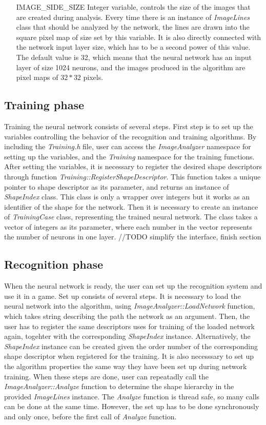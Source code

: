 \begin{enumerate}
\item [IMAGE\_SIDE\_SIZE] Integer variable, controls the size of the images that are created during analysis. Every time there is an instance of \emph{ImageLines} class that should be analyzed by the network, the lines are drawn into the square pixel map of size set by this variable. It is also directly connected with the network input layer size, which has to be a second power of this value. The default value is 32, which means that the neural network has an input layer of size 1024 neurons, and the images produced in the algorithm are pixel maps of $32*32$ pixels.

\end{enumerate}

\subsection{Training phase}
Training the neural network consists of several steps. First step is to set up the variables controlling the behavior of the recognition and training algorithms. By including the \emph{Training.h} file, user can access the \emph{ImageAnalyzer} namespace for setting up the variables, and the \emph{Training} namespace for the training functions. After setting the variables, it is necessary to register the desired shape descriptors through function \emph{Training::RegisterShapeDescriptor}. This function takes a unique pointer to shape descriptor as its parameter, and returns an instance of \emph{ShapeIndex} class. This class is only a wrapper over integers but it works as an identifier of the shape for the network. Then it is necessary to create an instance of \emph{TrainingCase} class, representing the trained neural network. The class takes a vector of integers as its parameter, where each number in the vector represents the number of neurons in one layer. 
//TODO simplify the interface, finish section

\subsection{Recognition phase}
When the neural network is ready, the user can set up the recognition system and use it in a game. Set up consists of several steps. It is necessary to load the neural network into the algorithm, using \emph{ImageAnalyzer::LoadNetwork} function, which takes string describing the path the network as an argument. Then, the user has to register the same descriptors uses for training of the loaded network again, togehter with the corresponding \emph{ShapeIndex} instance. Alternatively, the \emph{ShapeIndex} instance can be created given the order number of the corresponding shape descriptor when registered for the training. It is also necesssary to set up the algorithm properties the same way they have been set up during network training. When these steps are done, user can repeatadly call the \emph{ImageAnalyzer::Analyze} function to determine the shape hierarchy in the provided \emph{ImageLines} instance. The \emph{Analyze} function is thread safe, so many calls can be done at the same time. However, the set up has to be done synchronously and only once, before the first call of \emph{Analyze} function. 

